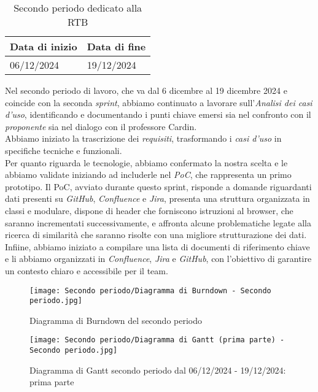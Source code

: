 \newpage
{}
\label{sec:secondo periodo}
\begin{table}[h!]
    \centering
    \renewcommand{\arraystretch}{1.5} %
    \begin{tabularx}{\textwidth}{|X|X|}\hline
    \rowcolor[HTML]{FFD700} 
    \textbf{Data di inizio} & \textbf{Data di fine} \\ \hline
    06/12/2024 & 19/12/2024 \\ \hline
    \end{tabularx}
    \caption{Secondo periodo dedicato alla RTB}
\end{table}
Nel secondo periodo di lavoro, che va dal 6 dicembre al 19 dicembre 2024 e coincide con la seconda \textit{sprint}, abbiamo continuato a lavorare sull’\emph{Analisi dei casi d’uso}, identificando e documentando i punti chiave emersi sia nel confronto con il \emph{proponente} sia nel dialogo con il professore Cardin.\\
Abbiamo iniziato la trascrizione dei \emph{requisiti}, trasformando i \emph{casi d’uso} in specifiche tecniche e funzionali.\\
Per quanto riguarda le tecnologie, abbiamo confermato la nostra scelta e le abbiamo validate iniziando ad includerle nel \emph{PoC}, che rappresenta un primo prototipo. Il PoC, avviato durante questo sprint, risponde a domande riguardanti dati presenti su \emph{GitHub}, \emph{Confluence} e \emph{Jira}, presenta una struttura organizzata in classi e modulare, dispone di header che forniscono istruzioni al browser, che saranno incrementati successivamente, e affronta alcune problematiche legate alla ricerca di similarità che saranno risolte con una migliore strutturazione dei dati. \\
Infiine, abbiamo iniziato a compilare una lista di documenti di riferimento chiave e li abbiamo organizzati in \emph{Confluence}, \emph{Jira} e \emph{GitHub}, con l’obiettivo di garantire un contesto chiaro e accessibile per il team.

\newpage
\begin{figure}[h] 
    \centering
    \texttt{[image: Secondo periodo/Diagramma di Burndown - Secondo periodo.jpg]}
    \caption{Diagramma di Burndown del secondo periodo} 
    \label{fig: Diagramma di Burndown del secondo periodo}
\end{figure}

\newpage

\begin{figure}[h] 
    \centering
    \texttt{[image: Secondo periodo/Diagramma di Gantt (prima parte) - Secondo periodo.jpg]}
    \caption{Diagramma di Gantt secondo periodo dal 06/12/2024 - 19/12/2024: prima parte} 
    \label{fig: Diagramma di Gantt primo periodo dal 06/12/2024 - 19/12/2024: prima parte}
\end{figure}

